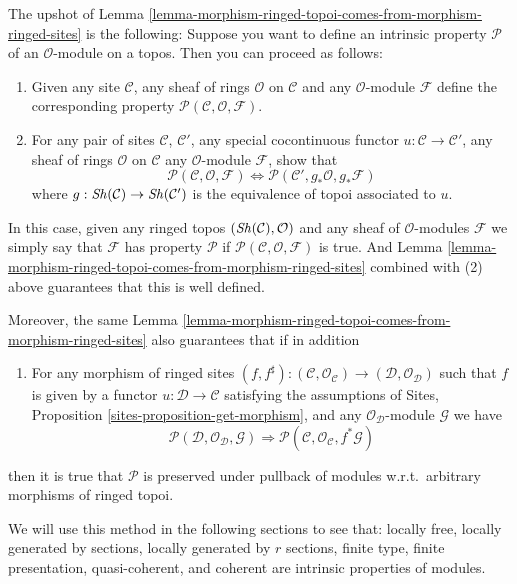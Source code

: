 \medskip\noindent
The upshot of
Lemma \ref{lemma-morphism-ringed-topoi-comes-from-morphism-ringed-sites}
is the following: Suppose you want to define
an intrinsic property $\mathcal{P}$ of an $\mathcal{O}$-module on a
topos. Then you can proceed as follows:
\begin{enumerate}
\item Given any site $\mathcal{C}$, any sheaf of rings $\mathcal{O}$
on $\mathcal{C}$ and any $\mathcal{O}$-module $\mathcal{F}$
define the corresponding
property $\mathcal{P}(\mathcal{C}, \mathcal{O}, \mathcal{F})$.
\item For any pair of sites $\mathcal{C}$, $\mathcal{C}'$, any
special cocontinuous functor $u : \mathcal{C} \to \mathcal{C}'$,
any sheaf of rings $\mathcal{O}$ on $\mathcal{C}$ any
$\mathcal{O}$-module $\mathcal{F}$, show that
$$
\mathcal{P}(\mathcal{C}, \mathcal{O}, \mathcal{F})
\Leftrightarrow
\mathcal{P}(\mathcal{C}', g_*\mathcal{O}, g_*\mathcal{F})
$$
where $g : \mathop{\mathit{Sh}}\nolimits(\mathcal{C}) \to \mathop{\mathit{Sh}}\nolimits(\mathcal{C}')$
is the equivalence of topoi associated to $u$.
\end{enumerate}
In this case, given any ringed topos $(\mathop{\mathit{Sh}}\nolimits(\mathcal{C}), \mathcal{O})$
and any sheaf of $\mathcal{O}$-modules $\mathcal{F}$ we simply say that
$\mathcal{F}$ has property $\mathcal{P}$ if
$\mathcal{P}(\mathcal{C}, \mathcal{O}, \mathcal{F})$ is true.
And Lemma \ref{lemma-morphism-ringed-topoi-comes-from-morphism-ringed-sites}
combined with (2) above guarantees that this is well defined.

\medskip\noindent
Moreover, the same
Lemma \ref{lemma-morphism-ringed-topoi-comes-from-morphism-ringed-sites}
also guarantees that if in addition
\begin{enumerate}
\item[(3)] For any morphism of ringed sites
$(f, f^\sharp) :
(\mathcal{C}, \mathcal{O}_\mathcal{C})
\to
(\mathcal{D}, \mathcal{O}_\mathcal{D})$
such that $f$ is given by a functor
$u : \mathcal{D} \to \mathcal{C}$ satisfying the
assumptions of Sites, Proposition \ref{sites-proposition-get-morphism},
and any $\mathcal{O}_\mathcal{D}$-module $\mathcal{G}$
we have
$$
\mathcal{P}(\mathcal{D}, \mathcal{O}_\mathcal{D}, \mathcal{G})
\Rightarrow
\mathcal{P}(\mathcal{C}, \mathcal{O}_\mathcal{C}, f^*\mathcal{G})
$$
\end{enumerate}
then it is true that $\mathcal{P}$ is preserved under pullback
of modules w.r.t.\ arbitrary morphisms of ringed topoi.

\medskip\noindent
We will use this method in the following sections to see
that:
locally free,
locally generated by sections,
locally generated by $r$ sections,
finite type,
finite presentation,
quasi-coherent, and
coherent
are intrinsic properties of modules.

